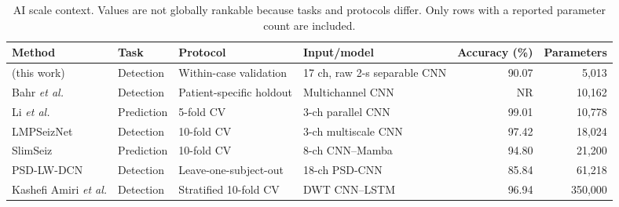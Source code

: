 \begin{table}[t]
\caption{AI scale context. Values are not globally rankable because tasks and
protocols differ. Only rows with a reported parameter count are included.}
\label{tab:ai-context}
\centering
\footnotesize
\begin{tabular}{llllrr}
\toprule
Method & Task & Protocol & Input/model & Accuracy (\%) & Parameters \\
\midrule
\episepset{} (this work) & Detection & Within-case validation & 17 ch, raw 2-s separable CNN & 90.07 & 5,013 \\
Bahr \emph{et al.} \cite{bahr2021} & Detection & Patient-specific holdout & Multichannel CNN & NR & 10,162 \\
Li \emph{et al.} \cite{li2022} & Prediction & 5-fold CV & 3-ch parallel CNN & 99.01 & 10,778 \\
LMPSeizNet \cite{lmpseiznet2024} & Detection & 10-fold CV & 3-ch multiscale CNN & 97.42 & 18,024 \\
SlimSeiz \cite{slimseiz2025} & Prediction & 10-fold CV & 8-ch CNN--Mamba & 94.80 & 21,200 \\
PSD-LW-DCN \cite{gu2026} & Detection & Leave-one-subject-out & 18-ch PSD-CNN & 85.84 & 61,218 \\
Kashefi Amiri \emph{et al.} \cite{kashefi2025} & Detection & Stratified 10-fold CV & DWT CNN--LSTM & 96.94 & 350,000 \\
\bottomrule
\end{tabular}
\end{table}
